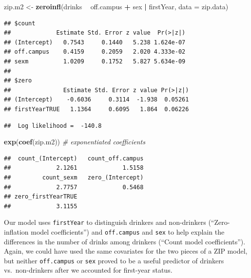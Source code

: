 \documentclass[
]{krantz}
\newenvironment{Shaded}{\begin{snugshade}}{\end{snugshade}}
\newcommand{\CommentTok}[1]{\textcolor[rgb]{0.37,0.37,0.37}{\textit{#1}}}
\newcommand{\DataTypeTok}[1]{\textcolor[rgb]{0.27,0.27,0.27}{#1}}
\newcommand{\KeywordTok}[1]{\textcolor[rgb]{0.27,0.27,0.27}{\textbf{#1}}}
\newcommand{\NormalTok}[1]{#1}
\newcommand{\OperatorTok}[1]{\textcolor[rgb]{0.43,0.43,0.43}{\textbf{#1}}}
\newcommand{\StringTok}[1]{\textcolor[rgb]{0.5,0.5,0.5}{#1}}
\begin{document}
\begin{Shaded}
\begin{Highlighting}[]
\NormalTok{zip.m2 <-}\StringTok{ }\KeywordTok{zeroinfl}\NormalTok{(drinks }\OperatorTok{~}\StringTok{ }\NormalTok{off.campus }\OperatorTok{+}\StringTok{ }\NormalTok{sex }\OperatorTok{|}\StringTok{ }\NormalTok{firstYear, }
                   \DataTypeTok{data =}\NormalTok{ zip.data)}
\end{Highlighting}
\end{Shaded}

\begin{verbatim}
## $count
##             Estimate Std. Error z value  Pr(>|z|)
## (Intercept)   0.7543     0.1440   5.238 1.624e-07
## off.campus    0.4159     0.2059   2.020 4.333e-02
## sexm          1.0209     0.1752   5.827 5.634e-09
## 
## $zero
##               Estimate Std. Error z value Pr(>|z|)
## (Intercept)    -0.6036     0.3114  -1.938  0.05261
## firstYearTRUE   1.1364     0.6095   1.864  0.06226
\end{verbatim}

\begin{verbatim}
##  Log likelihood =  -140.8
\end{verbatim}

\begin{Shaded}
\begin{Highlighting}[]
\KeywordTok{exp}\NormalTok{(}\KeywordTok{coef}\NormalTok{(zip.m2))   }\CommentTok{# exponentiated coefficients}
\end{Highlighting}
\end{Shaded}

\begin{verbatim}
##  count_(Intercept)   count_off.campus 
##             2.1261             1.5158 
##         count_sexm   zero_(Intercept) 
##             2.7757             0.5468 
## zero_firstYearTRUE 
##             3.1155
\end{verbatim}

Our model uses \texttt{firstYear} to distinguish drinkers and non-drinkers (``Zero-inflation model coefficients'') and \texttt{off.campus} and \texttt{sex} to help explain the differences in the number of drinks among drinkers (``Count model coefficients''). Again, we could have used the same covariates for the two pieces of a ZIP model, but neither \texttt{off.campus} or \texttt{sex} proved to be a useful predictor of drinkers vs.~non-drinkers after we accounted for first-year status.
\end{document}
